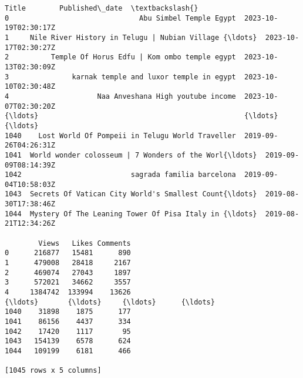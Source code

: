 \documentclass[11pt]{article}
\makeatletter
\newcommand{\boxspacing}{\kern\kvtcb@left@rule\kern\kvtcb@boxsep}
\newcommand{\prompt}[4]{
        {\ttfamily\llap{{\color{#2}[#3]:\hspace{3pt}#4}}\vspace{-\baselineskip}}
    }
\makeatother
\begin{document}
            \begin{tcolorbox}[breakable, size=fbox, boxrule=.5pt, pad at break*=1mm, opacityfill=0]
\prompt{Out}{outcolor}{35}{\boxspacing}
\begin{Verbatim}[commandchars=\\\{\}]
                                                  Title        Published\_date  \textbackslash{}
0                               Abu Simbel Temple Egypt  2023-10-19T02:30:17Z
1     Nile River History in Telugu | Nubian Village {\ldots}  2023-10-17T02:30:27Z
2          Temple Of Horus Edfu | Kom ombo temple egypt  2023-10-13T02:30:09Z
3               karnak temple and luxor temple in egypt  2023-10-10T02:30:48Z
4                     Naa Anveshana High youtube income  2023-10-07T02:30:20Z
{\ldots}                                                 {\ldots}                   {\ldots}
1040    Lost World Of Pompeii in Telugu World Traveller  2019-09-26T04:26:31Z
1041  World wonder colosseum | 7 Wonders of the Worl{\ldots}  2019-09-09T08:14:39Z
1042                          sagrada familia barcelona  2019-09-04T10:58:03Z
1043  Secrets Of Vatican City World's Smallest Count{\ldots}  2019-08-30T17:38:46Z
1044  Mystery Of The Leaning Tower Of Pisa Italy in {\ldots}  2019-08-21T12:34:26Z

        Views   Likes Comments
0      216877   15481      890
1      479008   28418     2167
2      469074   27043     1897
3      572021   34662     3557
4     1384742  133994    13626
{\ldots}       {\ldots}     {\ldots}      {\ldots}
1040    31898    1875      177
1041    86156    4437      334
1042    17420    1117       95
1043   154139    6578      624
1044   109199    6181      466

[1045 rows x 5 columns]
\end{Verbatim}
\end{tcolorbox}
        
\end{document}
